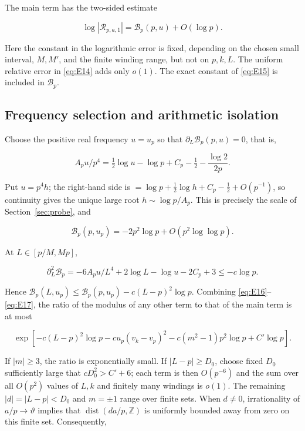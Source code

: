 \documentclass[11pt,a4paper]{article}
\numberwithin{equation}{section}
\theoremstyle{plain}
\theoremstyle{definition}
\begin{document}
The main term has the two-sided estimate

\begin{equation}
\log|\mathcal R_{p,a,1}|=\mathcal B_p(p,u)+O(\log p).
\label{eq:E17}
\end{equation}

Here the constant in the logarithmic error is fixed, depending on the chosen small interval, \(M,M'\), and the finite winding range, but not on \(p,k,L\). The uniform relative error in \eqref{eq:E14} adds only \(o(1)\). The exact constant of \eqref{eq:E15} is included in \(\mathcal B_p\).

\subsection{Frequency selection and arithmetic isolation}\label{sec:frequency}

Choose the positive real frequency \(u=u_p\) so that \(\partial_L\mathcal B_p(p,u)=0\), that is,

\begin{equation}
A_p u/p^4=\tfrac12\log u-\log p+C_p-\tfrac12-\frac{\log2}{2p}.
\label{eq:E18}
\end{equation}

Put \(u=p^4 h\); the right-hand side is \(=\log p+\frac12\log h+C_p-\frac12+O(p^{-1})\), so continuity gives the unique large root \(h\sim\log p/A_p\). This is precisely the scale of Section~\ref{sec:probe}, and

\[\mathcal B_p(p,u_p)=-2p^2\log p+O(p^2\log\log p).\]

At \(L\in[p/M,Mp]\),

\[\partial_L^2\mathcal B_p=-6A_p u/L^4+2\log L-\log u-2C_p+3\le-c\log p.\]

Hence \(\mathcal B_p(L,u_p)\le\mathcal B_p(p,u_p)-c(L-p)^2\log p\). Combining \eqref{eq:E16}--\eqref{eq:E17}, the ratio of the modulus of any other term to that of the main term is at most

\begin{equation}
\exp[-c(L-p)^2\log p-c u_p(v_k-v_p)^2-c(m^2-1)p^2\log p+C'\log p].
\label{eq:E19}
\end{equation}

If \(|m|\ge3\), the ratio is exponentially small. If \(|L-p|\ge D_0\), choose fixed \(D_0\) sufficiently large that \(cD_0^2>C'+6\); each term is then \(O(p^{-6})\) and the sum over all \(O(p^2)\) values of \(L,k\) and finitely many windings is \(o(1)\). The remaining \(|d|=|L-p|<D_0\) and \(m=\pm1\) range over finite sets. When \(d\ne0\), irrationality of \(a/p\to\vartheta\) implies that \(\operatorname{dist}(d a/p,\mathbb Z)\) is uniformly bounded away from zero on this finite set. Consequently,
\end{document}
